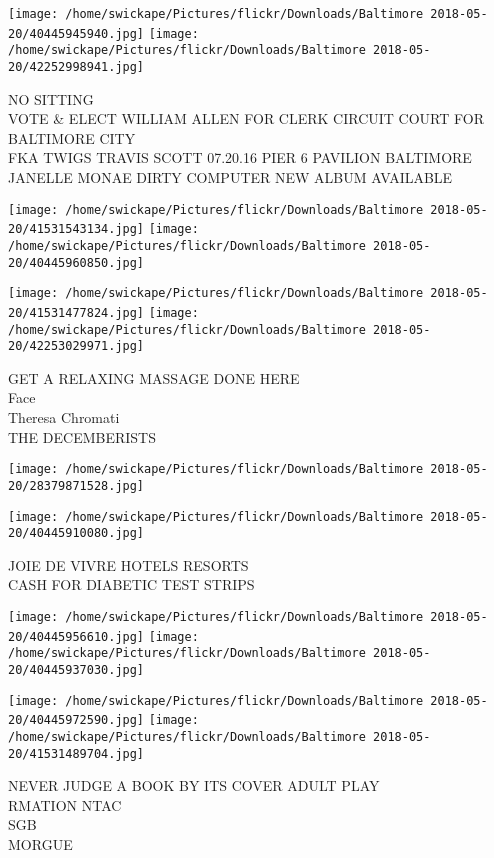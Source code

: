 \documentclass[10pt,letterpaper]{article}
\begin{document}
\texttt{[image: /home/swickape/Pictures/flickr/Downloads/Baltimore 2018-05-20/40445945940.jpg]}
\texttt{[image: /home/swickape/Pictures/flickr/Downloads/Baltimore 2018-05-20/42252998941.jpg]}

NO SITTING\\
VOTE \& ELECT WILLIAM ALLEN FOR CLERK CIRCUIT COURT FOR BALTIMORE CITY\\
FKA TWIGS TRAVIS SCOTT 07.20.16 PIER 6 PAVILION BALTIMORE\\
JANELLE MONAE DIRTY COMPUTER NEW ALBUM AVAILABLE
\pagebreak

\texttt{[image: /home/swickape/Pictures/flickr/Downloads/Baltimore 2018-05-20/41531543134.jpg]}
\texttt{[image: /home/swickape/Pictures/flickr/Downloads/Baltimore 2018-05-20/40445960850.jpg]}

\texttt{[image: /home/swickape/Pictures/flickr/Downloads/Baltimore 2018-05-20/41531477824.jpg]}
\texttt{[image: /home/swickape/Pictures/flickr/Downloads/Baltimore 2018-05-20/42253029971.jpg]}

GET A RELAXING MASSAGE DONE HERE\\
Face\\
Theresa Chromati\\
THE DECEMBERISTS
\pagebreak

\texttt{[image: /home/swickape/Pictures/flickr/Downloads/Baltimore 2018-05-20/28379871528.jpg]}

\vspace{0.25in}
\texttt{[image: /home/swickape/Pictures/flickr/Downloads/Baltimore 2018-05-20/40445910080.jpg]}

JOIE DE VIVRE HOTELS RESORTS\\
CASH FOR DIABETIC TEST STRIPS
\pagebreak

\texttt{[image: /home/swickape/Pictures/flickr/Downloads/Baltimore 2018-05-20/40445956610.jpg]}
\texttt{[image: /home/swickape/Pictures/flickr/Downloads/Baltimore 2018-05-20/40445937030.jpg]}

\texttt{[image: /home/swickape/Pictures/flickr/Downloads/Baltimore 2018-05-20/40445972590.jpg]}
\texttt{[image: /home/swickape/Pictures/flickr/Downloads/Baltimore 2018-05-20/41531489704.jpg]}

NEVER JUDGE A BOOK BY ITS COVER ADULT PLAY\\
RMATION NTAC\\
SGB\\
MORGUE
\pagebreak
\end{document}
